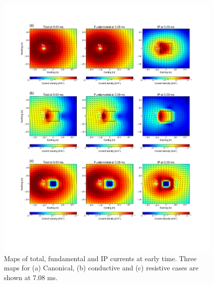 \documentclass[a4paper, 11pt]{article}
\begin{document}
\begin{figure}[htb]
  \centering  \includegraphics[width=1.0\textwidth]{figures/threecasesresp/IPcurrents_ch6.png}
  \caption{Maps of total, fundamental and IP currents at early time. Three maps for  (a) Canonical, (b) conductive and (c) resistive cases are shown at 7.08 ms.}
  \label{F:IPcurrents1}
\end{figure}
\end{document}

